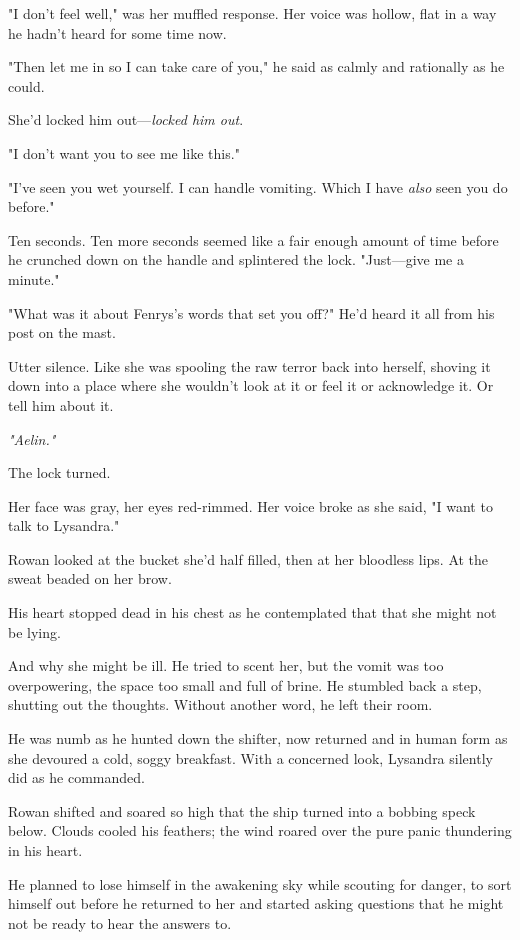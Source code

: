 "I don't feel well," was her muffled response. Her voice was hollow, flat in a way he hadn't heard for some time now.

"Then let me in so I can take care of you," he said as calmly and rationally as he could.

She'd locked him out---\emph{locked him out}.

"I don't want you to see me like this."

"I've seen you wet yourself. I can handle vomiting. Which I have
\emph{also} seen you do before."

Ten seconds. Ten more seconds seemed like a fair enough amount of time before he crunched down on the handle and splintered the lock. "Just---give me a minute."

"What was it about Fenrys's words that set you off?" He'd heard it all from his post on the mast.

Utter silence. Like she was spooling the raw terror back into herself, shoving it down into a place where she wouldn't look at it or feel it or acknowledge it. Or tell him about it.

\emph{"Aelin."}

The lock turned.

Her face was gray, her eyes red-rimmed. Her voice broke as she said, "I want to talk to Lysandra."

Rowan looked at the bucket she'd half filled, then at her bloodless lips. At the sweat beaded on her brow.

His heart stopped dead in his chest as he contemplated that 
that she might not be lying.

And why she might be ill. He tried to scent her, but the vomit was too overpowering, the space too small and full of brine. He stumbled back a step, shutting out the thoughts. Without another word, he left their room.

He was numb as he hunted down the shifter, now returned and in human form as she devoured a cold, soggy breakfast. With a concerned look, Lysandra silently did as he commanded.

Rowan shifted and soared so high that the ship turned into a bobbing speck below. Clouds cooled his feathers; the wind roared over the pure panic thundering in his heart.

He planned to lose himself in the awakening sky while scouting for danger, to sort himself out before he returned to her and started asking questions that he might not be ready to hear the answers to.

